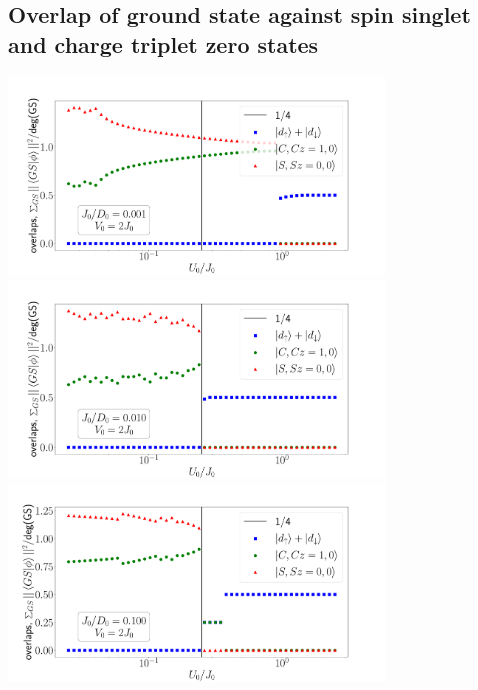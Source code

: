 \documentclass{report}
\numberwithin{equation}{section}
\begin{document}
\subsection*{Overlap of ground state against spin singlet and charge triplet zero states}
\begin{center}
	\includegraphics[width=0.75\textwidth]{../figures/overlaps_gs_D=400,J=0.400.pdf}\\
	\includegraphics[width=0.75\textwidth]{../figures/overlaps_gs_D=400,J=4.000.pdf}\\
	\includegraphics[width=0.75\textwidth]{../figures/overlaps_gs_D=400,J=40.000.pdf}
\end{center}
\end{document}

